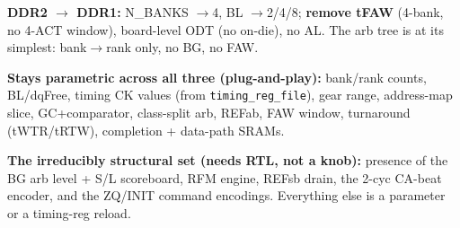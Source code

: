 \documentclass[10pt]{article}
\begin{document}
\textbf{DDR2 $\rightarrow$ DDR1:} N\_BANKS $\to$4, BL $\to$2/4/8; \textbf{remove tFAW} (4-bank,
no 4-ACT window), board-level ODT (no on-die), no AL. The arb tree is at its simplest:
bank$\to$rank only, no BG, no FAW.

\textbf{Stays parametric across all three (plug-and-play):} bank/rank counts, BL/dqFree,
timing CK values (from \texttt{timing\_reg\_file}), gear range, address-map slice, GC+comparator,
class-split arb, REFab, FAW window, turnaround (tWTR/tRTW), completion + data-path SRAMs.

\textbf{The irreducibly structural set (needs RTL, not a knob):} presence of the BG arb level +
S/L scoreboard, RFM engine, REFsb drain, the 2-cyc CA-beat encoder, and the ZQ/INIT command
encodings. Everything else is a parameter or a timing-reg reload.
\end{document}
